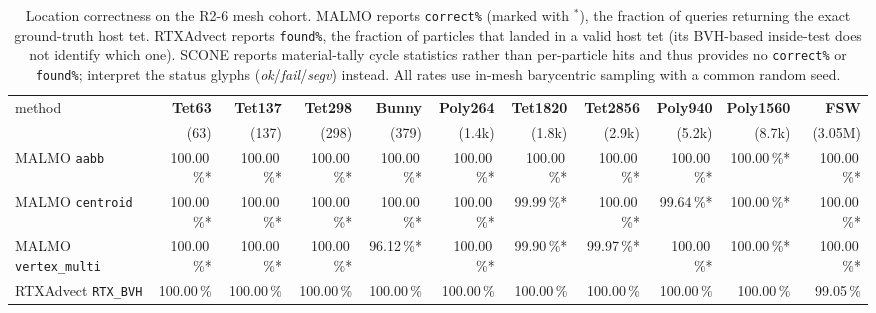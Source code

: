 \begin{table}[t]
\centering\small
\caption{Location correctness on the R2-6 mesh cohort. MALMO reports \texttt{correct\%} (marked with $^*$), the fraction of queries returning the exact ground-truth host tet. RTXAdvect reports \texttt{found\%}, the fraction of particles that landed in a valid host tet (its BVH-based inside-test does not identify which one). SCONE reports material-tally cycle statistics rather than per-particle hits and thus provides no \texttt{correct\%} or \texttt{found\%}; interpret the status glyphs (\textit{ok}/\textit{fail}/\textit{segv}) instead. All rates use in-mesh barycentric sampling with a common random seed.}
\label{tab:r26-found}
\begin{tabular}{lrrrrrrrrrr}
\toprule
method & \textbf{Tet63} & \textbf{Tet137} & \textbf{Tet298} & \textbf{Bunny} & \textbf{Poly264} & \textbf{Tet1820} & \textbf{Tet2856} & \textbf{Poly940} & \textbf{Poly1560} & \textbf{FSW} \\
 & (63) & (137) & (298) & (379) & (1.4k) & (1.8k) & (2.9k) & (5.2k) & (8.7k) & (3.05M) \\
\midrule
MALMO \texttt{aabb} & 100.00\,\%* & 100.00\,\%* & 100.00\,\%* & 100.00\,\%* & 100.00\,\%* & 100.00\,\%* & 100.00\,\%* & 100.00\,\%* & 100.00\,\%* & 100.00\,\%* \\
MALMO \texttt{centroid} & 100.00\,\%* & 100.00\,\%* & 100.00\,\%* & 100.00\,\%* & 100.00\,\%* & 99.99\,\%* & 100.00\,\%* & 99.64\,\%* & 100.00\,\%* & 100.00\,\%* \\
MALMO \texttt{vertex\_multi} & 100.00\,\%* & 100.00\,\%* & 100.00\,\%* & 96.12\,\%* & 100.00\,\%* & 99.90\,\%* & 99.97\,\%* & 100.00\,\%* & 100.00\,\%* & 100.00\,\%* \\
\midrule
RTXAdvect \texttt{RTX\_BVH} & 100.00\,\% & 100.00\,\% & 100.00\,\% & 100.00\,\% & 100.00\,\% & 100.00\,\% & 100.00\,\% & 100.00\,\% & 100.00\,\% & 99.05\,\% \\
\bottomrule
\end{tabular}
\end{table}
